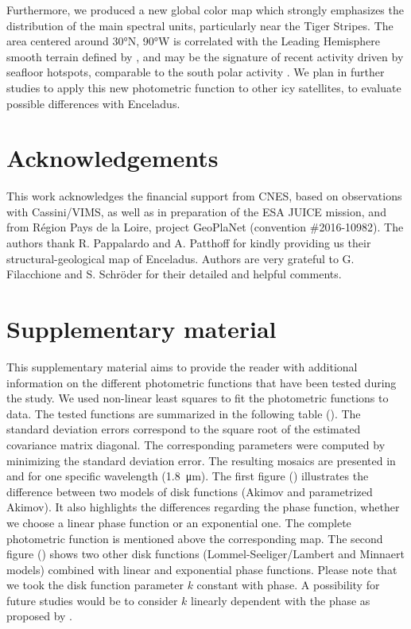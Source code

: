 \documentclass{arxiv-icarus}
\begin{document}
Furthermore, we produced a new global color map which strongly emphasizes the distribution of the main spectral units, particularly near the Tiger Stripes. The area centered around \ang{30}N, \ang{90}W is correlated with the Leading Hemisphere smooth terrain defined by \cite{Crow-Willard2015}, and may be the signature of recent activity driven by seafloor hotspots, comparable to the south polar activity \citep{Choblet2017}. We plan in further studies to apply this new photometric function to other icy satellites, to evaluate possible differences with Enceladus.

\section*{Acknowledgements}

This work acknowledges the financial support from CNES, based on observations with Cassini/VIMS, as well as in preparation of the ESA JUICE mission, and from R\'{e}gion Pays de la Loire, project GeoPlaNet (convention \#2016-10982). The authors thank R. Pappalardo and A. Patthoff for kindly providing us their structural-geological map of Enceladus. Authors are very grateful to G. Filacchione and S. Schr\"{o}der for their detailed and helpful comments.





\clearpage
\onecolumn
\appendix
\section{Supplementary material}
\setcounter{figure}{0}

This supplementary material aims to provide the reader with additional information on the different photometric functions that have been tested during the study. We used non-linear least squares to fit the photometric functions to data. The tested functions are summarized in the following table (). The standard deviation errors correspond to the square root of the estimated covariance matrix diagonal. The corresponding parameters were computed by minimizing the standard deviation error. The resulting mosaics are presented in  and  for one specific wavelength (\SI{1.8}{\um}). The first figure () illustrates the difference between two models of disk functions (Akimov and parametrized Akimov). It also highlights the differences regarding the phase function, whether we choose a linear phase function or an exponential one. The complete photometric function is mentioned above the corresponding map. The second figure () shows two other disk functions (Lommel-Seeliger/Lambert and Minnaert models) combined with linear and exponential phase functions.
Please note that we took the disk function parameter $k$ constant with phase. A possibility for future studies would be to consider $k$ linearly dependent with the phase as proposed by \cite{Schroder2017}.
\end{document}
